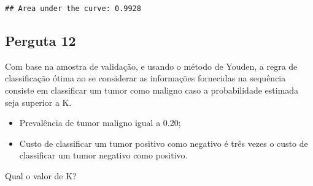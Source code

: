 \documentclass[
]{article}
\providecommand{\tightlist}{%
  \setlength{\itemsep}{0pt}\setlength{\parskip}{0pt}}
\begin{document}
\begin{verbatim}
## Area under the curve: 0.9928
\end{verbatim}

\subsection{Perguta 12}\label{perguta-12}

Com base na amostra de validação, e usando o método de Youden, a regra
de classificação ótima ao se considerar as informações fornecidas na
sequência consiste em classificar um tumor como maligno caso a
probabilidade estimada seja superior a K.

\begin{itemize}
\tightlist
\item
  Prevalência de tumor maligno igual a 0.20;
\item
  Custo de classificar um tumor positivo como negativo é três vezes o
  custo de classificar um tumor negativo como positivo.
\end{itemize}

Qual o valor de K?
\end{document}
